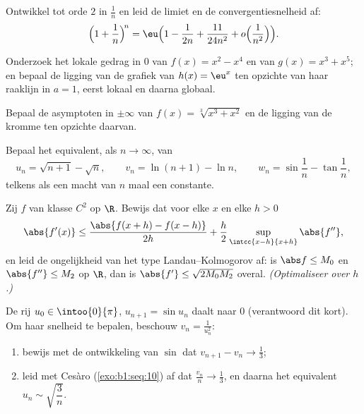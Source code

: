 \begin{exercise}[$\star\star$]\label{exo:b1:taylor:5}
Ontwikkel tot orde $2$ in $\frac1n$ en leid de limiet en de
convergentiesnelheid af:
\[
\Bigl(1 + \frac 1n\Bigr)^{\!n}
= \eu\Bigl(1 - \frac{1}{2n} + \frac{11}{24n^2} +
o\Bigl(\frac{1}{n^2}\Bigr)\Bigr).
\]
\end{exercise}

\begin{exercise}[$\star\star$]\label{exo:b1:taylor:6}
Onderzoek het lokale gedrag in $0$ van $f(x) = x^2 - x^4$ en van
$g(x) = x^3 + x^5$; en bepaal de ligging van de grafiek van $h(x) =
\eu^x$ ten opzichte van haar raaklijn in $a = 1$, eerst lokaal en
daarna globaal.
\end{exercise}

\begin{exercise}[$\star\star$]\label{exo:b1:taylor:7}
Bepaal de asymptoten in $\pm\infty$ van $f(x) = \sqrt[3]{x^3 + x^2}$
en de ligging van de kromme ten opzichte daarvan.
\end{exercise}

\begin{exercise}[$\star\star$]\label{exo:b1:taylor:8}
Bepaal het equivalent, als $n \to \infty$, van
\[
u_n = \sqrt{n+1} - \sqrt n, \qquad
v_n = \ln(n+1) - \ln n, \qquad
w_n = \sin\frac{1}{n} - \tan\frac{1}{n},
\]
telkens als een macht van $n$ maal een constante.
\end{exercise}

\begin{exercise}[$\star\star\star$]\label{exo:b1:taylor:9}
Zij $f$ van klasse $C^2$ op $\R$. Bewijs dat voor elke $x$ en elke
$h > 0$
\[
\abs{f'(x)} \leq \frac{\abs{f(x+h) - f(x-h)}}{2h} +
\frac{h}{2}\sup_{\intcc{x-h}{x+h}}\abs{f''} ,
\]
en leid de ongelijkheid van het type Landau--Kolmogorov af: is
$\abs f \leq M_0$ en $\abs{f''} \leq M_2$ op $\R$, dan is
$\abs{f'} \leq \sqrt{2 M_0 M_2}$ overal. \emph{(Optimaliseer over
$h$.)}
\end{exercise}

\begin{exercise}[$\star\star\star$]\label{exo:b1:taylor:10}
De rij $u_0 \in \intoo{0}{\pi}$, $u_{n+1} = \sin u_n$ daalt naar
$0$ (verantwoord dit kort). Om haar snelheid te bepalen, beschouw
$v_n = \frac{1}{u_n^2}$:
\begin{enumerate}
  \item bewijs met de ontwikkeling van $\sin$ dat $v_{n+1} - v_n \to
        \frac13$;
  \item leid met Cesàro (\cref{exo:b1:seq:10}) af dat
        $\frac{v_n}{n} \to \frac13$, en daarna het equivalent $u_n
        \sim \sqrt{\dfrac{3}{n}}$.
\end{enumerate}
\end{exercise}

